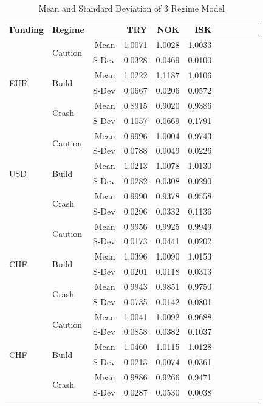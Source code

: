 \documentclass[12pt, a4paper, oneside]{article} %
\begin{document}
\begin{table}[ht]
\centering
\begin{tabular}{llrrrrrrrrr}
  \hline
 Funding&Regime& & TRY & NOK & ISK&&\\ 
 \hline
  \hline
\multirow{6}{*}{EUR}&\multirow{2}{*}{Caution}&Mean & 1.0071 & 1.0028 & 1.0033 \\ 
  &&S-Dev & 0.0328 & 0.0469 & 0.0100 \\ 
  & \multirow{2}{*}{Build} & Mean & 1.0222 & 1.1187 & 1.0106 \\
  && S-Dev & 0.0667 & 0.0206 & 0.0572 \\ 
  & \multirow{2}{*}{Crash} & Mean & 0.8915 & 0.9020 & 0.9386 \\ 
  && S-Dev & 0.1057 & 0.0669 & 0.1791 \\ 
\hline
\multirow{6}{*}{USD}& \multirow{2}{*}{Caution} & Mean   & 0.9996 & 1.0004 & 0.9743 \\ 
  && S-Dev & 0.0788 & 0.0049 & 0.0226 \\ 
  & \multirow{2}{*}{Build} & Mean & 1.0213 & 1.0078 & 1.0130 \\ 
  && S-Dev & 0.0282 & 0.0308 & 0.0290  \\ 
  & \multirow{2}{*}{Crash} & Mean & 0.9990 & 0.9378 & 0.9558 \\ 
  && S-Dev & 0.0296 & 0.0332 & 0.1136 \\ 
\hline
\multirow{6}{*}{CHF}& \multirow{2}{*}{Caution} & Mean& 0.9956 & 0.9925 & 0.9949 \\ 
  && S-Dev & 0.0173 & 0.0441 & 0.0202 \\ 
  & \multirow{2}{*}{Build} &  Mean & 1.0396 & 1.0090 & 1.0153 \\ 
  && S-Dev & 0.0201 & 0.0118 & 0.0313 \\ 
  & \multirow{2}{*}{Crash} & Mean & 0.9943 & 0.9851 & 0.9750  \\ 
  &&S-Dev & 0.0735 & 0.0142 & 0.0801 \\ 
\hline
\multirow{6}{*}{CHF}& \multirow{2}{*}{Caution} & Mean & 1.0041 & 1.0092 & 0.9688 \\ 
  && S-Dev& 0.0858 & 0.0382 & 0.1037 \\ 
  & \multirow{2}{*}{Build} & Mean & 1.0460 & 1.0115 & 1.0128 \\ 
  && S-Dev & 0.0213 & 0.0074 & 0.0361 \\ 
  & \multirow{2}{*}{Crash} & Mean & 0.9886 & 0.9266 & 0.9471 \\ 
  && S-Dev& 0.0287 & 0.0530 & 0.0038 \\ 
   \hline
\end{tabular}
\caption{Mean and Standard Deviation of 3 Regime Model}
\label{tabref:3statemod}
\end{table}
\end{document}
